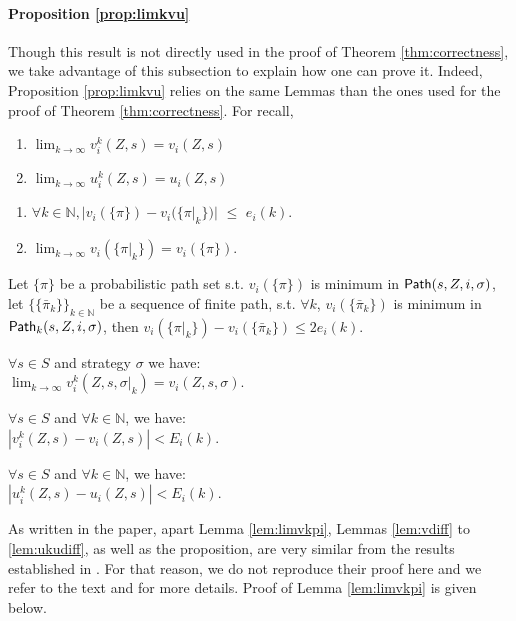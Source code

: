 \paragraph{Proposition \ref{prop:limkvu}} Though this result is not directly used in the proof of Theorem \ref{thm:correctness}, we take advantage of this subsection to explain how one can prove it. Indeed, Proposition \ref{prop:limkvu} relies on the same Lemmas than the ones used for the proof of Theorem \ref{thm:correctness}.
For recall,
\begin{proposition}\label{prop:limkvu}
	\begin{enumerate}
		\item $\lim_{k\to\infty} v_i^{k}(Z,s)=v_i(Z,s)$
		\item $\lim_{k\to\infty} u_i^{k}(Z,s)=u_i(Z,s)$
	\end{enumerate}
\end{proposition}
\begin{lemma}\label{lem:limvkpi}
	\begin{enumerate}
		\item $\forall k\in \mathbb{N}, |v_i(\{\pi\})-v_i(\{\pi|_k\})|$ $\le$ $e_i(k)$.	
		\item $\lim_{k\to\infty}  v_i(\{\pi|_k\})=v_i(\{\pi\})$.
	\end{enumerate}
\end{lemma}
\begin{lemma}\label{lem:vdiff}
	Let $\{ \pi \}$ be a probabilistic path set s.t. $v_i(\{\pi\})$ is minimum in ${\sf Path}(s,Z,i,\sigma)$, let $\{\{\bar\pi_k \} \}_{k \in \mathbb{N}}$ be a sequence of finite path, s.t. $\forall k$, $v_i(\{\bar\pi_k   \})$ is minimum in ${\sf Path}_k(s,Z,i,\sigma)$, then $v_i(\{\pi|_k\})-v_i(\{\bar\pi_k\}) \le 2e_i(k)$.
\end{lemma}
\begin{lemma}\label{lem:limvkz}
	$\forall s\in S$ and strategy $\sigma$ we have:\\
	$\lim_{k\to\infty} v_i^{k}(Z,s,\sigma|_k) = v_i(Z,s,\sigma) $.
\end{lemma}
\begin{lemma}\label{lem:vkvdiff}
	$\forall  s\in S$ and $\forall k \in \mathbb{N}$, we have:\\
	$|v_i^{k}(Z,s)-v_i(Z,s)| < E_i(k)$.
\end{lemma}
\begin{lemma}\label{lem:ukudiff}
	$\forall s\in S$ and $\forall k \in \mathbb{N}$, we have: \\
	$|u_i^{k}(Z,s) - u_i(Z,s)| < E_i(k)$.
\end{lemma}
As written in the paper, apart Lemma \ref{lem:limvkpi}, Lemmas \ref{lem:vdiff} to \ref{lem:ukudiff}, as well as the proposition, are very similar from the results established in \cite{MariPhD}. For that reason, we do not reproduce their proof here and we refer to the text and \cite{MariPhD} for more details. Proof of Lemma \ref{lem:limvkpi} is given below. 

